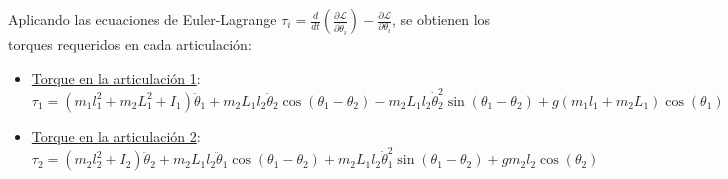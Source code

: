 Aplicando las ecuaciones de Euler-Lagrange $\tau_i = \frac{d}{dt}\left(\frac{\partial \mathcal{L}}{\partial \dot{\theta}_i}\right) - \frac{\partial \mathcal{L}}{\partial \theta_i}$, se obtienen los torques requeridos en cada articulación:\\
\begin{itemize}[label=$\bullet$]
    \item \underline{Torque en la articulación 1}:
    \begin{equation}
    \tau_1 = (m_1l_1^2 + m_2L_1^2 + I_1)\ddot{\theta}_1 + m_2L_1l_2\ddot{\theta}_2\cos(\theta_1 - \theta_2) - m_2L_1l_2\dot{\theta}_2^2\sin(\theta_1 - \theta_2) + g(m_1l_1 + m_2L_1)\cos(\theta_1)
    \label{ec:torqueT1}
    \end{equation}
    \item \underline{Torque en la articulación 2}:
    \begin{equation}
    \tau_2 = (m_2l_2^2 + I_2)\ddot{\theta}_2 + m_2L_1l_2\ddot{\theta}_1\cos(\theta_1 - \theta_2) + m_2L_1l_2\dot{\theta}_1^2\sin(\theta_1 - \theta_2) + gm_2l_2\cos(\theta_2)
    \label{ec:torqueT2}
    \end{equation}
\end{itemize}






